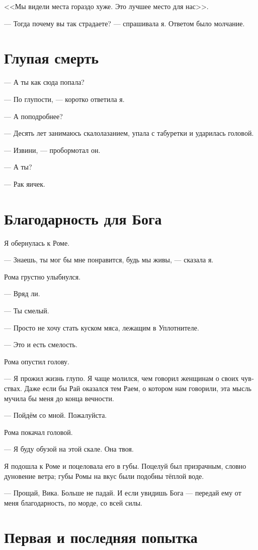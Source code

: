 \documentclass[a4paper,10pt,fleqn]{book}\usepackage{polyglossia}\setdefaultlanguage[babelshorthands=true]{russian}\setotherlanguage{english}\defaultfontfeatures{Ligatures=TeX,Mapping=tex-text}\usepackage{xcolor}\newcommand{\ml}[3]{#2}
\begin{document}
<<Мы видели места гораздо хуже.
Это лучшее место для нас>>.

--- Тогда почему вы так страдаете? --- спрашивала я.
Ответом было молчание.

\section{Глупая смерть}

--- А ты как сюда попала?

--- По глупости, --- коротко ответила я.

--- А поподробнее?

--- Десять лет занимаюсь скалолазанием, упала с табуретки и ударилась головой.

--- Извини, --- пробормотал он.

--- А ты?

--- Рак яичек.

\section{Благодарность для Бога}

Я обернулась к Роме.

--- Знаешь, ты мог бы мне понравится, будь мы живы, --- сказала я.

Рома грустно улыбнулся.

--- Вряд ли.

--- Ты смелый.

--- Просто не хочу стать куском мяса, лежащим в Уплотнителе.

--- Это и есть смелость.

Рома опустил голову.

--- Я прожил жизнь глупо.
Я чаще молился, чем говорил женщинам о своих чувствах.
Даже если бы Рай оказался тем Раем, о котором нам говорили, эта мысль мучила бы меня до конца вечности.

--- Пойдём со мной.
Пожалуйста.

Рома покачал головой.

--- Я буду обузой на этой скале.
Она твоя.

Я подошла к Роме и поцеловала его в губы.
Поцелуй был призрачным, словно дуновение ветра;
губы Ромы на вкус были подобны тёплой воде.

--- Прощай, Вика.
Больше не падай.
И если увидишь Бога --- передай ему от меня благодарность, по морде, со всей силы.

\section{Первая и последняя попытка}
\end{document}
